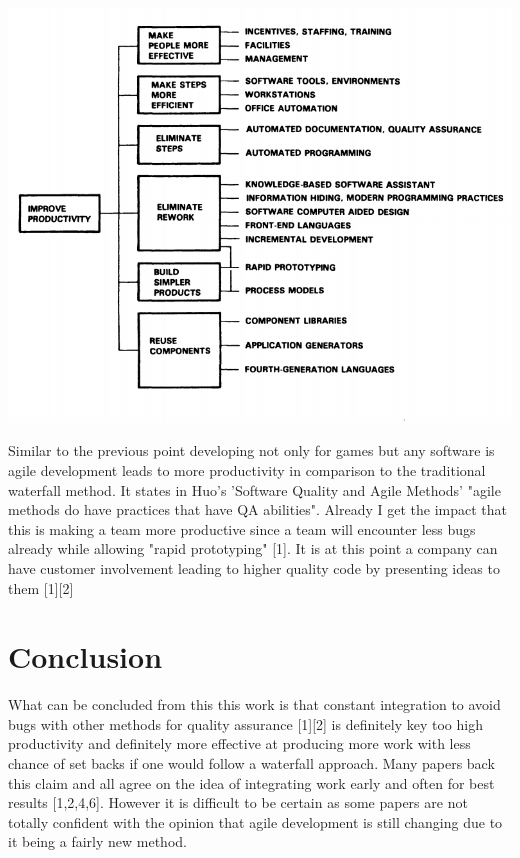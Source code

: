 \documentclass{scrartcl}
\begin{document}
\includegraphics{ImprovingProductivity.PNG}

Similar to the previous point developing not only for games but any software is agile development leads to more productivity in comparison to the traditional waterfall method. It states in Huo's 'Software Quality and Agile Methods' "agile methods do have practices that have QA abilities". Already I get the impact that this is making a team more productive since a team will encounter less bugs already while allowing "rapid prototyping" [1]. It is at this point a company can have customer involvement leading to higher quality code by presenting ideas to them [1][2] \cite{bhasinqa2012}



\section{Conclusion}

What can be concluded from this this work is that constant integration to avoid bugs with other methods for quality assurance [1][2] is definitely key too high productivity and definitely more effective at producing more work with less chance of set backs if one would follow a waterfall approach. Many papers back this claim and all agree on the idea of integrating work early and often for best results [1,2,4,6]. However it is difficult to be certain as some papers are not totally confident with the opinion that agile development is still changing due to it being a fairly new method. 
\end{document}
